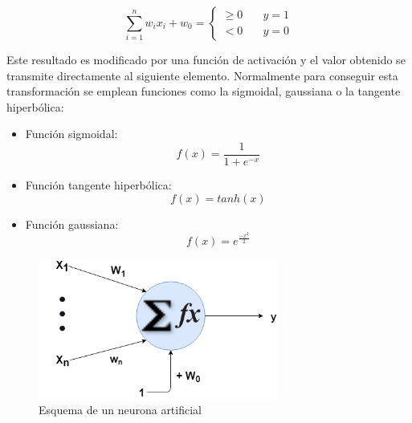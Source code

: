 \begin{equation} \label{eq:perceptron}
    \displaystyle\sum_{i=1}^{n} w_i x_i + w_0= 
    \begin{cases}
        \geq 0       & \quad y = 1 \\
        <    0       & \quad y = 0
    \end{cases}
\end{equation}

Este resultado es modificado por una función de activación y el valor obtenido se transmite directamente al siguiente elemento. Normalmente para conseguir esta transformación se emplean funciones como la sigmoidal, gaussiana o la tangente hiperbólica:

\begin{itemize}
    \item Función sigmoidal: 
    \begin{equation}
        f(x) = \frac{1}{1 + e^{-x}}
    \end{equation}
    
    \item Función tangente hiperbólica: 
    \begin{equation}
        f(x) = tanh(x)
    \end{equation}
    
    \item Función gaussiana: 
    \begin{equation}
        f(x) = e^{\frac{-x^2}{2}}
    \end{equation}
    
    
\end{itemize}



\begin{figure}[H]
    \centering
    \includegraphics[width=0.7\textwidth, keepaspectratio]{imaxes/neurona.png}
    \caption{Esquema de un neurona artificial}
    \label{fig:neurona}
\end{figure}







